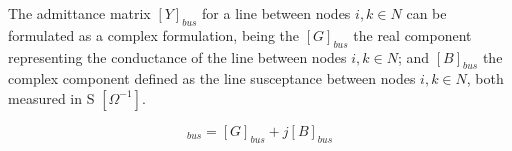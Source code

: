 The admittance matrix $[Y]_{bus}$ for a line between nodes $i,k \in N$ can be formulated as a complex formulation, being the $[G]_{bus}$ the real component representing the conductance of the line between nodes $i,k \in N$; and  $[B]_{bus}$ the complex component defined as the line susceptance between nodes $i,k \in N$, both measured in S $[\Omega^{-1}]$. 

\begin{equation*}
[Y]_{bus} = [G]_{bus} + j[B]_{bus}
\end{equation*}



%


